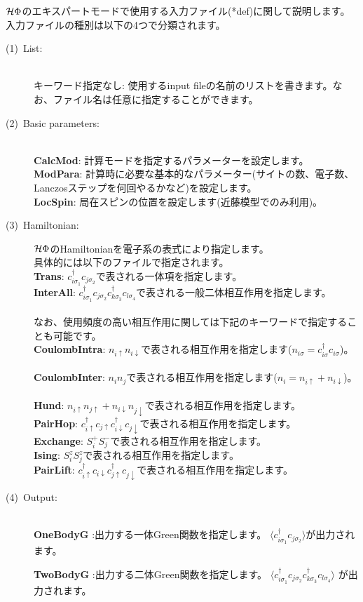 $\mathcal{H} \Phi$のエキスパートモードで使用する入力ファイル(*def)に関して説明します。
入力ファイルの種別は以下の4つで分類されます。
\begin{description}
\item[(1)~List:]
~\\{キーワード指定なし}:
使用するinput fileの名前のリストを書きます。なお、ファイル名は任意に指定することができます。
\item[(2)~Basic parameters:]
~\\{\bf CalcMod}: 計算モードを指定するパラメーターを設定します。
~\\{\bf ModPara}: 計算時に必要な基本的なパラメーター(サイトの数、電子数、Lanczosステップを何回やるかなど)を設定します。
~\\{\bf LocSpin}: 局在スピンの位置を設定します(近藤模型でのみ利用)。
\item[(3)~Hamiltonian:] 
$\mathcal{H} \Phi$のHamiltonianを電子系の表式により指定します。
~\\具体的には以下のファイルで指定されます。
~\\{\bf Trans}: $c_{i\sigma_1}^{\dag}c_{j\sigma_2}$で表される一体項を指定します。
~\\{\bf InterAll}: $c_ {i \sigma_1}^{\dag}c_{j\sigma_2}c_{k \sigma_3}^{\dag}c_{l \sigma_4}$で表される一般二体相互作用を指定します。\\
~\\なお、使用頻度の高い相互作用に関しては下記のキーワードで指定することも可能です。
~\\{\bf CoulombIntra}: $n_ {i \uparrow}n_{i \downarrow}$で表される相互作用を指定します($n_{i \sigma}=c_{i\sigma}^{\dag}c_{i\sigma}$)。
~\\{\bf CoulombInter}: $n_ {i}n_{j}$で表される相互作用を指定します($n_i=n_{i\uparrow}+n_{i\downarrow}$)。
~\\{\bf Hund}: $n_{i\uparrow}n_{j\uparrow}+n_{i\downarrow}n_{j\downarrow}$で表される相互作用を指定します。
~\\{\bf PairHop}:  $c_ {i \uparrow}^{\dag}c_{j\uparrow}c_{i \downarrow}^{\dag}c_{j  \downarrow}$で表される相互作用を指定します。
~\\{\bf Exchange}: $S_i^+ S_j^-$で表される相互作用を指定します。
~\\{\bf Ising}: $S_i^z S_j^z$で表される相互作用を指定します。
~\\{\bf PairLift}: $c_ {i \uparrow}^{\dag}c_{i\downarrow}c_{j \uparrow}^{\dag}c_{j \downarrow}$で表される相互作用を指定します。
\item[(4)~Output:]
~\\{\bf OneBodyG }:出力する一体Green関数を指定します。
 $\langle c^{\dagger}_{i\sigma_1}c_{j\sigma_2}\rangle$が出力されます。

 {\bf TwoBodyG }:出力する二体Green関数を指定します。
 $\langle c^{\dagger}_{i\sigma_1}c_{j\sigma_2}c^{\dagger}_{k \sigma_3}c_{l\sigma_4}\rangle$
が出力されます。
\end{description}
